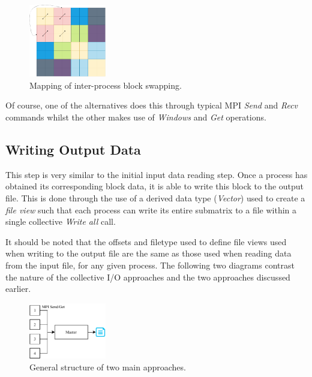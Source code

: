 \documentclass[journal,10pt,a4paper]{IEEEtran}
\begin{document}
\begin{figure}[H]
    \centering
    \includegraphics[width=0.3\textwidth]{block.pdf}
    \caption{Mapping of inter-process block swapping.}
    \label{fig:my_label}
\end{figure}

Of course, one of the alternatives does this through typical MPI \textit{Send} and \textit{Recv} commands whilst the other makes use of \textit{Windows} and \textit{Get} operations.



\subsection{Writing Output Data}

This step is very similar to the initial input data reading step. Once a process has obtained its corresponding block data, it is able to write this block to the output file. This is done through the use of a derived data type (\textit{Vector}) used to create a \textit{file view} such that each process can write its entire submatrix to a file within a single collective \textit{Write all} call.%

It should be noted that the offsets and filetype used to define file views used when writing to the output file are the same as those used when reading data from the input file, for any given process. The following two diagrams contrast the nature of the collective I/O approaches and the two approaches discussed earlier.

\begin{figure}[H]
    \centering
    \includegraphics[width=0.3\textwidth]{norm.pdf}
    \caption{General structure of two main approaches.}
    \label{fig:my_label}
\end{figure}
\end{document}
